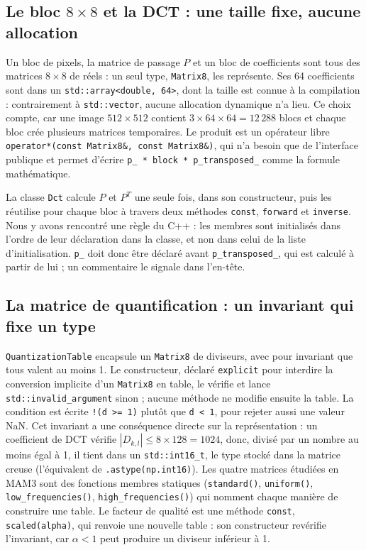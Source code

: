 \documentclass[10pt,a4paper]{article}
\newcommand{\code}[1]{\texttt{#1}}
\begin{document}
\subsection{Le bloc \texorpdfstring{$8\times8$}{8x8} et la DCT : une taille fixe, aucune allocation}
Un bloc de pixels, la matrice de passage $P$ et un bloc de coefficients sont tous des matrices
$8\times8$ de réels : un seul type, \code{Matrix8}, les représente. Ses 64 coefficients sont
dans un \code{std::array<double, 64>}, dont la taille est connue à la compilation :
contrairement à \code{std::vector}, aucune allocation dynamique n'a lieu. Ce choix compte, car
une image $512\times512$ contient $3\times64\times64 = 12\,288$ blocs et chaque bloc crée
plusieurs matrices temporaires. Le produit est un opérateur libre
\code{operator*(const Matrix8\&, const Matrix8\&)}, qui n'a besoin que de l'interface publique
et permet d'écrire \code{p\_ * block * p\_transposed\_} comme la formule mathématique.

La classe \code{Dct} calcule $P$ et $P^T$ une seule fois, dans son constructeur, puis les
réutilise pour chaque bloc à travers deux méthodes \code{const}, \code{forward} et
\code{inverse}. Nous y avons rencontré une règle du C++ : les membres sont initialisés dans
l'ordre de leur déclaration dans la classe, et non dans celui de la liste d'initialisation.
\code{p\_} doit donc être déclaré avant \code{p\_transposed\_}, qui est calculé à partir de lui ;
un commentaire le signale dans l'en-tête.

\subsection{La matrice de quantification : un invariant qui fixe un type}
\code{QuantizationTable} encapsule un \code{Matrix8} de diviseurs, avec pour invariant que tous
valent au moins 1. Le constructeur, déclaré \code{explicit} pour interdire la conversion
implicite d'un \code{Matrix8} en table, le vérifie et lance \code{std::invalid\_argument}
sinon ; aucune méthode ne modifie ensuite la table. La condition est écrite \code{!(d >= 1)}
plutôt que \code{d < 1}, pour rejeter aussi une valeur NaN. Cet invariant a une conséquence
directe sur la représentation : un coefficient de DCT vérifie $|D_{k,l}| \leq 8\times128 = 1024$,
donc, divisé par un nombre au moins égal à 1, il tient dans un \code{std::int16\_t}, le type
stocké dans la matrice creuse (l'équivalent de \code{.astype(np.int16)}). Les quatre matrices
étudiées en MAM3 sont des fonctions membres statiques (\code{standard()}, \code{uniform()},
\code{low\_frequencies()}, \code{high\_frequencies()}) qui nomment chaque manière de construire
une table. Le facteur de qualité est une méthode \code{const}, \code{scaled(alpha)}, qui renvoie
une nouvelle table : son constructeur revérifie l'invariant, car $\alpha < 1$ peut produire un
diviseur inférieur à 1.
\end{document}
